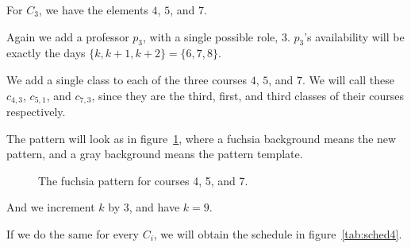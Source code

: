 For {\color{Fuchsia} $C_3$}, we have the elements $4$, $5$, and $7$.

Again we add a professor $p_3$, with a single possible role, $3$. $p_3$'s availability will be exactly the days $\{k, k + 1, k + 2\} = \{6, 7, 8\}$.

We add a single class to each of the three courses $4$, $5$, and $7$. We will call these $c_{4, 3}$, $c_{5, 1}$, and $c_{7, 3}$, since they are the third, first, and third classes of their courses respectively.

The pattern will look as in figure~\ref{tab:sched3}, where a {\color{Fuchsia}fuchsia} background means the new pattern, and a {\color{gray}gray} background means the pattern template.

\begin{figure}
\begin{center}
\caption{The {\color{Fuchsia}fuchsia} pattern for courses 4, 5, and 7.}
\label{tab:sched3}
\end{center}
\end{figure}
And we increment $k$ by $3$, and have $k = 9$.

If we do the same for every $C_i$, we will obtain the schedule in figure~\ref{tab:sched4}.

